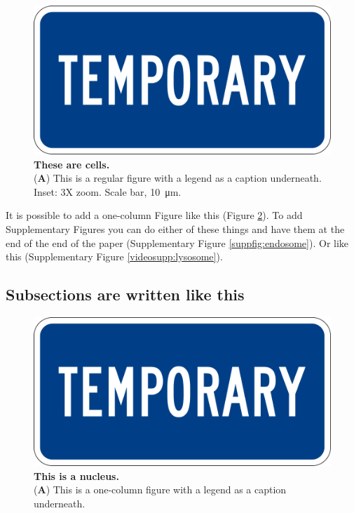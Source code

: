 \begin{figure}
\centering
\includegraphics[width=0.75\linewidth]{Figures/temp.png}
\caption{\textbf{These are cells.}\\
(\textbf{A}) This is a regular figure with a legend as a caption underneath. Inset: 3X zoom. Scale bar, \SI{10}{\micro\meter}.}
\label{fig:cells}
\end{figure}

It is possible to add a one-column Figure like this (Figure \ref{fig:nucleus}).
To add Supplementary Figures you can do either of these things and have them at the end of the end of the paper (Supplementary Figure \ref{suppfig:endosome}).
Or like this (Supplementary Figure \ref{videosupp:lysosome}).

\lipsum[10]

\subsection*{Subsections are written like this}

\lipsum[11]

\begin{figure}
\centering
\includegraphics[width=0.75\linewidth]{Figures/temp.png}
\caption{\textbf{This is a nucleus.}\\
(\textbf{A}) This is a one-column figure with a legend as a caption underneath.}
\label{fig:nucleus}
\end{figure}

